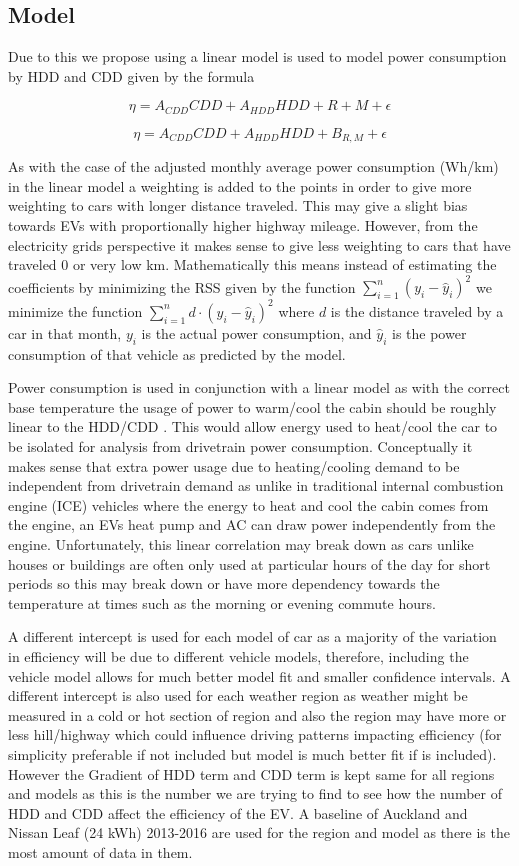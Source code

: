 \documentclass[
]{article}
\begin{document}
\hypertarget{model}{%
\subsection{Model}\label{model}}

Due to this we propose using a linear model is used to model power
consumption by HDD and CDD given by the formula

\[ \eta = A_{CDD}{CDD} + A_{HDD}{HDD} + R + M + \epsilon\]

\[ \eta = A_{CDD}{CDD} + A_{HDD}{HDD} + B_{R,M} + \epsilon\]

As with the case of the adjusted monthly average power consumption
(Wh/km) in the linear model a weighting is added to the points in order
to give more weighting to cars with longer distance traveled. This may
give a slight bias towards EVs with proportionally higher highway
mileage. However, from the electricity grids perspective it makes sense
to give less weighting to cars that have traveled 0 or very low km.
Mathematically this means instead of estimating the coefficients by
minimizing the RSS given by the function
\(\sum_{i =1}^{n}(y_{i}-\hat{y}_{i})^2\) we minimize the function
\(\sum_{i =1}^{n}d \cdot(y_{i}-\hat{y}_{i})^2\) where \(d\) is the
distance traveled by a car in that month, \(y_{i}\) is the actual power
consumption, and \(\hat{y}_{i}\) is the power consumption of that
vehicle as predicted by the model.

Power consumption is used in conjunction with a linear model as with the
correct base temperature the usage of power to warm/cool the cabin
should be roughly linear to the HDD/CDD \cite{HDD_est}. This would allow
energy used to heat/cool the car to be isolated for analysis from
drivetrain power consumption. Conceptually it makes sense that extra
power usage due to heating/cooling demand to be independent from
drivetrain demand as unlike in traditional internal combustion engine
(ICE) vehicles where the energy to heat and cool the cabin comes from
the engine, an EVs heat pump and AC can draw power independently from
the engine. Unfortunately, this linear correlation may break down as
cars unlike houses or buildings are often only used at particular hours
of the day for short periods so this may break down or have more
dependency towards the temperature at times such as the morning or
evening commute hours.

A different intercept is used for each model of car as a majority of the
variation in efficiency will be due to different vehicle models,
therefore, including the vehicle model allows for much better model fit
and smaller confidence intervals. A different intercept is also used for
each weather region as weather might be measured in a cold or hot
section of region and also the region may have more or less hill/highway
which could influence driving patterns impacting efficiency (for
simplicity preferable if not included but model is much better fit if is
included). However the Gradient of HDD term and CDD term is kept same
for all regions and models as this is the number we are trying to find
to see how the number of HDD and CDD affect the efficiency of the EV. A
baseline of Auckland and Nissan Leaf (24 kWh) 2013-2016 are used for the
region and model as there is the most amount of data in them.
\end{document}
